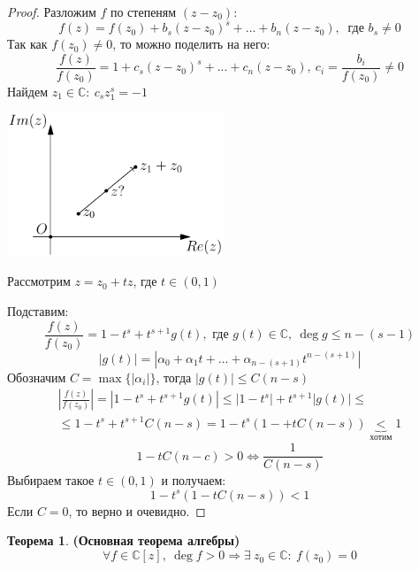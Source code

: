\documentclass[a4paper, 12pt]{article}
\theoremstyle{definition}
\newtheorem*{theorem}{Теорема}
\begin{document}
  \begin{proof}
    Разложим $f$ по степеням $(z-z_0)$:
    $$f(z) = f(z_0) + b_s(z-z_0)^s + ... + b_n(z-z_0), \ \text{ где } b_s \neq 0$$
    Так как $f(z_0) \neq 0$, то можно поделить на него:
    $$\frac{f(z)}{f(z_0)} = 1 + c_s(z-z_0)^s + ... + c_n(z-z_0), \ c_i = \frac{b_i}{f(z_0)} \neq 0$$  
    Найдем $z_1 \in \mathbb{C}: \ c_sz_1^s = -1$
    \begin{center}
      \includegraphics[width=6.5cm]{image/lecture-22.pdf}
    \end{center}

    \begin{center}
      Рассмотрим $z = z_0 + tz$, где $t \in (0,1)$
    \end{center}
    Подставим: 
    $$\frac{f(z)}{f(z_0)} = 1 - t^s + t^{s+1} g(t), \text{ где } g(t) \in \mathbb{C}, \ \deg g \leq n-(s-1)$$
    $$|g(t)| = |\alpha_0 + \alpha_1t + ... + \alpha_{n-(s+1)}t^{n-(s+1)}|$$ 
    Обозначим $C = \max\{|\alpha_i|\}$, тогда $|g(t)|\leq C(n-s)$
    \begin{multline*}
      |\frac{f(z)}{f(z_0)}| = |1 - t^s + t^{s+1} g(t)| \leq |1 - t^s| + t^{s+1} |g(t)| \leq \\ \leq 1 - t^s + t^{s+1} C(n-s) = 1 - t^s(1-+ tC(n-s)) \underbrace{<}_{\text{хотим}} 1
    \end{multline*} 
     $$1-tC(n-c)>0 \Longleftrightarrow \frac{1}{C(n-s)}$$
     Выбираем такое $t \in (0,1)$ и получаем:
     $$1-t^s(1-tC(n-s)) < 1$$
     Если $C=0$, то верно и очевидно.   
  \end{proof}
  \begin{theorem} \textbf{(Основная теорема алгебры)} 
    $$\forall f \in \mathbb{C}[z], \ \deg f >0 \Longrightarrow  \exists \ z_0 \in \mathbb{C}: \ f(z_0) = 0$$
  \end{theorem}
\end{document}
